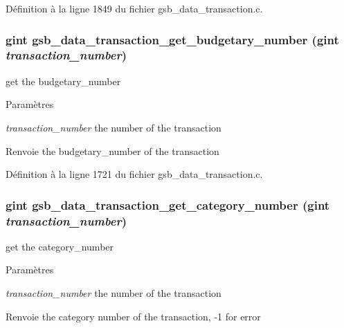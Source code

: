 Définition à la ligne 1849 du fichier gsb\_\-data\_\-transaction.c.

\subsubsection[{gsb\_\-data\_\-transaction\_\-get\_\-budgetary\_\-number}]{\setlength{\rightskip}{0pt plus 5cm}gint gsb\_\-data\_\-transaction\_\-get\_\-budgetary\_\-number (gint {\em transaction\_\-number})}\label{gsb__data__transaction_8h_a4d84c55dbdfa032c500f4ade0754501f}
get the budgetary\_\-number 
\begin{DoxyParams}{Paramètres}
\item[{\em transaction\_\-number}]the number of the transaction \end{DoxyParams}
\begin{DoxyReturn}{Renvoie}
the budgetary\_\-number of the transaction 
\end{DoxyReturn}


Définition à la ligne 1721 du fichier gsb\_\-data\_\-transaction.c.

\subsubsection[{gsb\_\-data\_\-transaction\_\-get\_\-category\_\-number}]{\setlength{\rightskip}{0pt plus 5cm}gint gsb\_\-data\_\-transaction\_\-get\_\-category\_\-number (gint {\em transaction\_\-number})}\label{gsb__data__transaction_8h_a5cdaf5e8911118bf8d1dbdfc42dc4761}
get the category\_\-number


\begin{DoxyParams}{Paramètres}
\item[{\em transaction\_\-number}]the number of the transaction\end{DoxyParams}
\begin{DoxyReturn}{Renvoie}
the category number of the transaction, -\/1 for error 
\end{DoxyReturn}



